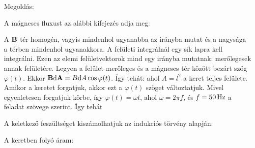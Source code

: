 
\ifdefined\megoldas

 Megoldás: 

 A mágneses fluxust az alábbi kifejezés adja meg:

 A $\mathbf{B}$ tér homogén, vagyis mindenhol ugyanabba az irányba mutat és a nagysága a térben mindenhol ugyanakkora. A felületi integrálnál egy sík lapra kell integrálni. Ezen az elemi felületvektorok mind egy irányba mutatnak: merőlegesek annak felületére. Legyen a felület merőleges és a mágneses tér között bezárt szög $\varphi(t)$. Ekkor $\mathbf{B}\mathrm{d}\mathbf{A}=B\mathrm{d} A\cos\varphi(t)$. Így tehát:
 ahol $A=l^2$ a keret teljes felülete. Amikor a keretet forgatjuk, akkor ezt a $\varphi(t)$ szöget változtatjuk. Mivel egyenletesen forgatjuk körbe, így $\varphi(t)=\omega t$, ahol $\omega=2\pi f$, és $f=50\mathrm{\, Hz}$ a feladat szövege szerint. Így tehát 

 A keletkező feszültséget kiszámolhatjuk az indukciós törvény alapján:

 A keretben folyó áram:
 
\fi